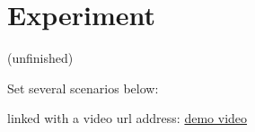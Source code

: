\chapter{Experiment}
\label{Ch-6:Sec:Experiment}
(unfinished)

Set several scenarios below:

linked with a video url address: \href{https://www.dropbox.com/s/hjhwtqyeijgeue3/03192019demo.mp4?dl=0}{demo video}